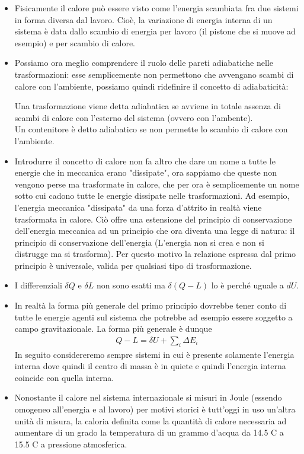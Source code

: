 \documentclass[
10pt, %
a4paper, %
oneside, %
headinclude,footinclude, %
BCOR5mm, %
]{scrartcl}
\begin{document}
\begin{itemize}
	\item Fisicamente il calore può essere visto come l'energia scambiata fra due sistemi in forma diversa dal lavoro. Cioè, la variazione di energia interna di un sistema è data dallo scambio di energia per lavoro (il pistone che si muove ad esempio)  e per scambio di calore.
	\item Possiamo ora meglio comprendere il ruolo delle pareti adiabatiche nelle trasformazioni: esse semplicemente non permettono che avvengano scambi di calore con l'ambiente, possiamo quindi ridefinire il concetto di adiabaticità:
	\begin{definition}[Adiabaticità]
		Una trasformazione viene detta adiabatica se avviene in totale assenza di scambi di calore con l'esterno del sistema (ovvero con l'ambente).\\
		Un contenitore è detto adiabatico se non permette lo scambio di calore con l'ambiente.
	\end{definition}
	\item Introdurre il concetto di calore non fa altro che dare un nome a tutte le energie che in meccanica erano "dissipate", ora sappiamo che queste non vengono perse ma trasformate in calore, che per ora è semplicemente un nome sotto cui cadono tutte le energie dissipate nelle trasformazioni. Ad esempio, l'energia meccanica "dissipata" da una forza d'attrito in realtà viene trasformata in calore. Ciò offre una estensione del principio di conservazione dell'energia meccanica ad un principio che ora diventa una legge di natura: il principio di conservazione dell'energia (L'energia non si crea e non si distrugge ma si trasforma). Per questo motivo la relazione espressa dal primo principio è universale, valida per qualsiasi tipo di trasformazione. 
	\item I differenziali $\delta Q$ e $\delta L$ non sono esatti ma $\delta(Q-L)$ lo è perché uguale a $dU$.
	\item In realtà la forma più generale del primo principio dovrebbe tener conto di tutte le energie agenti sul sistema che potrebbe ad esempio essere soggetto a campo gravitazionale. La forma più generale è dunque
	\begin{align*} 
		Q-L = \delta U + \sum_i \Delta E_i
	\end{align*} 
	In seguito considereremo sempre sistemi in cui è presente solamente l'energia interna dove quindi il centro di massa è in quiete e quindi l'energia interna coincide con quella interna. 
	\item Nonostante il calore nel sistema internazionale si misuri in Joule (essendo omogeneo all'energia e al lavoro) per motivi storici è tutt'oggi in uso un'altra unità di misura, la caloria definita come la quantità di calore necessaria ad aumentare di un grado la temperatura di un grammo d'acqua da 14.5 C a 15.5 C a pressione atmosferica. 

\end{itemize}
\end{document}
